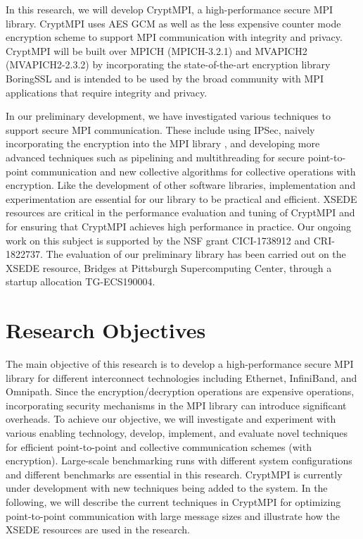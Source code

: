 In this research, we will develop CryptMPI, a high-performance secure MPI library.
CryptMPI uses AES GCM as well as the less expensive counter mode encryption scheme
to support MPI communication with integrity and privacy.
CryptMPI will be built over MPICH (MPICH-3.2.1) and MVAPICH2 (MVAPICH2-2.3.2)
by incorporating the state-of-the-art encryption library BoringSSL and is intended
to be used by the broad community with MPI applications that require integrity
and privacy.

In our preliminary development, we have investigated various techniques to support
secure MPI communication. These include using IPSec, naively incorporating the
encryption into the MPI library \cite{Cluster:Naser19}, and developing more
advanced techniques such as pipelining and multithreading for secure
point-to-point communication and new collective algorithms for collective operations
with encryption. Like the development of other software libraries, implementation and
experimentation are essential for our library to be
practical and efficient. XSEDE resources are critical in the performance
evaluation and tuning of CryptMPI and for ensuring that CryptMPI achieves high performance
in practice. Our ongoing work on this subject is supported by the NSF grant
CICI-1738912 and CRI-1822737. The evaluation of our preliminary library has been carried
out on the XSEDE resource, Bridges at Pittsburgh Supercomputing Center, through a
startup allocation TG-ECS190004. 

\section{Research Objectives}

The main objective of this research is to develop a high-performance secure MPI
library for different interconnect technologies including Ethernet, InfiniBand, and
Omnipath. Since the encryption/decryption operations are expensive operations,
incorporating security mechanisms in the MPI library can introduce significant
overheads. To achieve our objective, we will investigate and experiment with various
enabling technology, develop, implement, and evaluate novel techniques for efficient
point-to-point and collective communication schemes (with encryption). Large-scale
benchmarking runs with different system configurations and different benchmarks
are essential in this research. CryptMPI is currently under development with new
techniques being added to the system. In the following, we will describe
the current techniques in CryptMPI for optimizing point-to-point communication with
large message sizes and illustrate how the XSEDE resources are used in the
research. 

